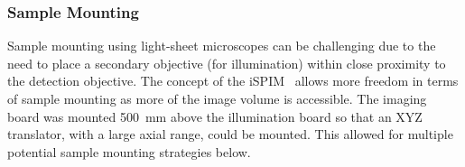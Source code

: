 




\subsubsection{Sample Mounting}

Sample mounting using light-sheet microscopes can be challenging due to the need to place a secondary objective (for illumination) within close proximity to the detection objective.
The concept of the \gls{iSPIM}~\cite{Wu2011} allows more freedom in terms of sample mounting as more of the image volume is accessible.
The \gls{imaging board} was mounted \SI{500}{\milli\meter} above the \gls{illumination board} so that an XYZ translator, with a large axial range, could be mounted.
This allowed for multiple potential sample mounting strategies below.

